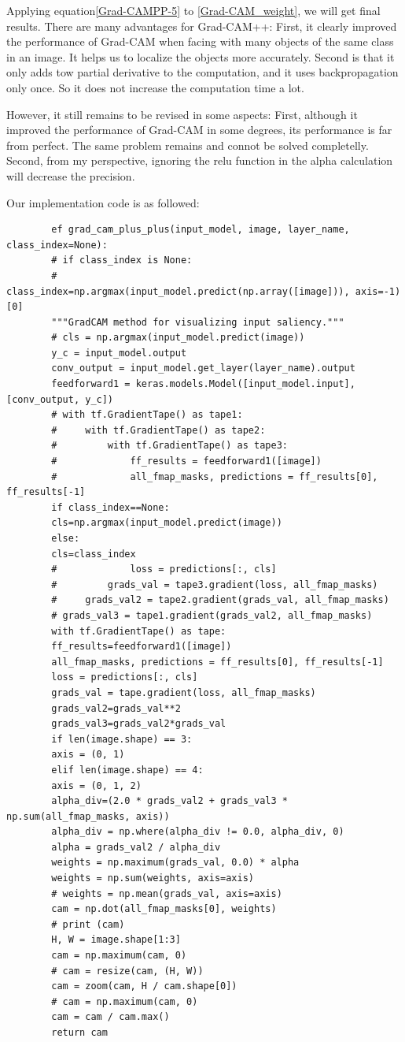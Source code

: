 \documentclass[conference]{IEEEtran}
\begin{document}
	Applying equation\ref{Grad-CAMPP-5} to \ref{Grad-CAM_weight}, we will get final results.
	There are many advantages for Grad-CAM++: First, it clearly improved the performance of Grad-CAM when facing with many objects of the same class in an image. It helps us to localize the objects more accurately. 
	Second is that it only adds tow partial derivative to the computation, and it uses backpropagation only once. So it does not increase the computation time a lot.\par
	However, it still remains to be revised in some aspects: First, although it improved the performance of Grad-CAM in some degrees, its performance is far from perfect. The same problem remains and connot be solved completelly. 
	Second, from my perspective, ignoring the relu function in the alpha calculation will decrease the precision.\par
	Our implementation code is as followed:
	\begin{lstlisting}
		ef grad_cam_plus_plus(input_model, image, layer_name, class_index=None):
		# if class_index is None:
		#     class_index=np.argmax(input_model.predict(np.array([image])), axis=-1)[0]
		"""GradCAM method for visualizing input saliency."""
		# cls = np.argmax(input_model.predict(image))
		y_c = input_model.output
		conv_output = input_model.get_layer(layer_name).output
		feedforward1 = keras.models.Model([input_model.input], [conv_output, y_c])
		# with tf.GradientTape() as tape1:
		#     with tf.GradientTape() as tape2:
		#         with tf.GradientTape() as tape3:
		#             ff_results = feedforward1([image])
		#             all_fmap_masks, predictions = ff_results[0], ff_results[-1]
		if class_index==None:
		cls=np.argmax(input_model.predict(image))
		else:
		cls=class_index
		#             loss = predictions[:, cls]
		#         grads_val = tape3.gradient(loss, all_fmap_masks)
		#     grads_val2 = tape2.gradient(grads_val, all_fmap_masks)
		# grads_val3 = tape1.gradient(grads_val2, all_fmap_masks)
		with tf.GradientTape() as tape:
		ff_results=feedforward1([image])
		all_fmap_masks, predictions = ff_results[0], ff_results[-1]
		loss = predictions[:, cls]
		grads_val = tape.gradient(loss, all_fmap_masks)
		grads_val2=grads_val**2
		grads_val3=grads_val2*grads_val
		if len(image.shape) == 3:
		axis = (0, 1)
		elif len(image.shape) == 4:
		axis = (0, 1, 2)
		alpha_div=(2.0 * grads_val2 + grads_val3 * np.sum(all_fmap_masks, axis))
		alpha_div = np.where(alpha_div != 0.0, alpha_div, 0)
		alpha = grads_val2 / alpha_div
		weights = np.maximum(grads_val, 0.0) * alpha
		weights = np.sum(weights, axis=axis)
		# weights = np.mean(grads_val, axis=axis)
		cam = np.dot(all_fmap_masks[0], weights)
		# print (cam)
		H, W = image.shape[1:3]
		cam = np.maximum(cam, 0)
		# cam = resize(cam, (H, W))
		cam = zoom(cam, H / cam.shape[0])
		# cam = np.maximum(cam, 0)
		cam = cam / cam.max()
		return cam
	\end{lstlisting}
\end{document}
